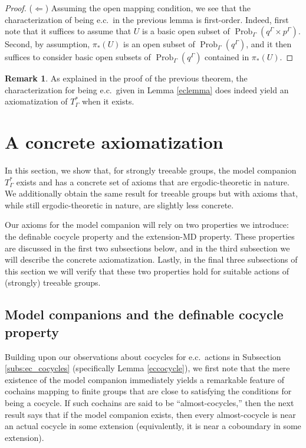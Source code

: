 \documentclass[12pt]{amsart}
\theoremstyle{definition}
\newtheorem{remark}[thm]{Remark}
\begin{document}
\begin{proof}
	($\Leftarrow$)  Assuming the open mapping condition, we see that the characterization of being e.c.\ in the previous lemma is first-order.  Indeed, first note that it suffices to assume that $U$ is a basic open subset of $\operatorname{Prob}_\Gamma(q^\Gamma\times p^\Gamma)$.  Second, by assumption, $\pi_*(U)$ is an open subset of $\operatorname{Prob}_\Gamma(q^\Gamma)$, and it then suffices to consider basic open subsets of $\operatorname{Prob}_\Gamma(q^\Gamma)$ contained in $\pi_*(U)$.
\end{proof}

\begin{remark}
	As explained in the proof of the previous theorem, the characterization for being e.c.\ given in Lemma \ref{eclemma} does indeed yield an axiomatization of $T_\Gamma^*$ when it exists.
\end{remark}

\section{A concrete axiomatization}\label{concrete}

In this section, we show that, for strongly treeable groups, the model companion $T_\Gamma^*$ exists and has a concrete set of axioms that are ergodic-theoretic in nature. We additionally obtain the same result for treeable groups but with axioms that, while still ergodic-theoretic in nature, are slightly less concrete.

Our axioms for the model companion will rely on two properties we introduce: the definable cocycle property and the extension-MD property. These properties are discussed in the first two subsections below, and in the third subsection we will describe the concrete axiomatization. Lastly, in the final three subsections of this section we will verify that these two properties hold for suitable actions of (strongly) treeable groups.

\subsection{Model companions and the definable cocycle property}\label{subs:definablecocycle}

Building upon our observations about cocycles for e.c.\ actions in Subsection \ref{subs:ec_cocycles} (specifically Lemma \ref{eccocycle}), we first note that the mere existence of the model companion immediately yields a remarkable feature of cochains mapping to finite groups that are close to satisfying the conditions for being a cocycle. If such cochains are said to be ``almost-cocycles,'' then the next result says that if the model companion exists, then every almost-cocycle is near an actual cocycle in some extension (equivalently, it is near a coboundary in some extension).
\end{document}
